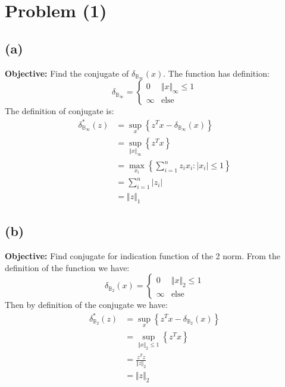 \documentclass[]{article}
\begin{document}
\section*{Problem (1)}
    \subsection*{(a)}
        \textbf{Objective: }Find the conjugate of $\delta_{\mathbb{B}_\infty}(x)$. The function has definition: 
        $$
        \delta_{\mathbb{B}_\infty} = 
        \begin{cases}
            0 & \Vert x\Vert_\infty \le 1
            \\
            \infty & \text{else}
        \end{cases}
        $$
        The definition of conjugate is: 
        \begin{align*}\tag{1a1}\label{eqn:1a1}
            \delta_{\mathbb{B}_\infty}^*(z) 
            &= 
            \sup_x \left\lbrace
                z^Tx - \delta_{\mathbb{B}_\infty}(x)
            \right\rbrace
            \\
            &= \sup_{\Vert x\Vert_\infty} \left\lbrace
            z^Tx
            \right\rbrace
            \\
            &= \max_{x_i}\left\lbrace
                \sum_{i = 1}^n z_i x_i: |x_i|\le 1
            \right\rbrace
            \\
            &= \sum_{i = 1}^n |z_i|
            \\
            &= \Vert z\Vert_1
        \end{align*}

    \subsection*{(b)}
        \textbf{Objective: }Find conjugate for indication function of the 2 norm. 
        From the definition of the function we have: 
        $$
        \delta_{\mathbb{B}_2}(x) = 
        \begin{cases}
            0 & \Vert x\Vert_2 \le 1 
            \\
            \infty & \text{else}
        \end{cases}
        $$
        Then by definition of the conjugate we have: 
        \begin{align*}\tag{1b1}\label{eqn:1b1}
            \delta_{\mathbb{B}_2}^*(z) &= 
            \sup_x \left\lbrace
                z^Tx - \delta_{\mathbb{B}_2}(x)
            \right\rbrace
            \\
            &= 
            \sup_{\Vert x\Vert_2 \le 1} \left\lbrace 
            z^Tx
            \right\rbrace
            \\
            &= \frac{z^Tz}{\Vert z\Vert_2}
            \\
            &= \Vert z\Vert_2
        \end{align*}
\end{document}
